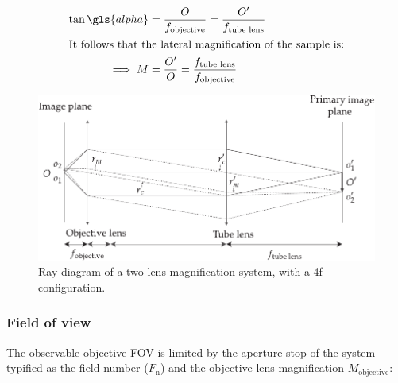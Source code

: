 
\begin{align}
    \tan \gls{alpha} &= \frac{O}{f_{\text{objective}}} =  \frac{O'}{f_{\text{tube lens}}} \\
    \intertext{It follows that the lateral magnification of the sample is:}
    \implies M &= \frac{O'}{O} = \frac{f_{\text{tube lens}}}
{f_{\text{objective}}}
\end{align}

\begin{figure}
    \centering
    \includegraphics{./magnification}
    \caption{Ray diagram of a two lens magnification system, with a \gls{4f} configuration.}
    \label{fig:magnification}
\end{figure}






\subsubsection{Field of view}


The observable objective \gls{FOV} is limited by the aperture stop of the system typified as the field number ($F_\text{n} $) and the \gls{objective lens} magnification $M_{\text{objective}}$:

